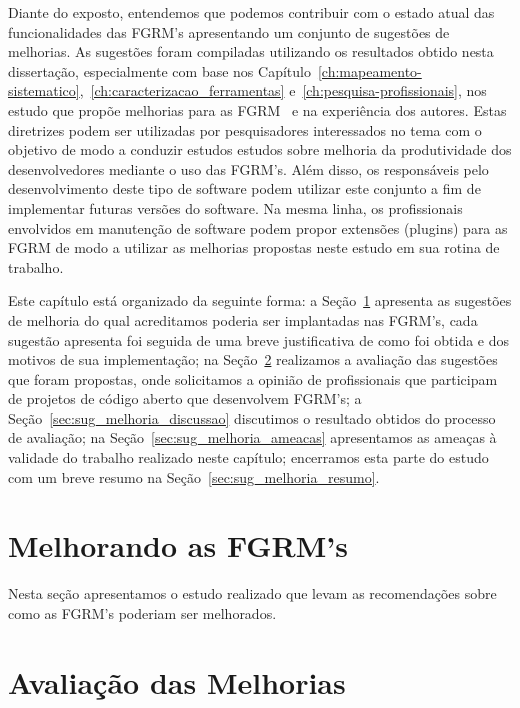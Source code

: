 Diante do exposto, entendemos que podemos contribuir com o estado atual das
funcionalidades das FGRM's apresentando um conjunto de sugestões de melhorias.
As sugestões foram compiladas utilizando os resultados obtido nesta dissertação,
especialmente com base nos
Capítulo~\ref{ch:mapeamento-sistematico},~\ref{ch:caracterizacao_ferramentas}
e~\ref{ch:pesquisa-profissionais}, nos estudo que propõe melhorias para as
FGRM~\cite{zimmermann2009improving, bettenburg2008makes, singh2011bug} e na
experiência dos autores. Estas diretrizes podem ser utilizadas por pesquisadores
interessados no tema com o objetivo de modo a conduzir estudos estudos sobre
melhoria da produtividade dos desenvolvedores mediante o uso das FGRM's. Além
disso, os responsáveis pelo desenvolvimento deste tipo de software podem
utilizar este conjunto a fim de implementar futuras versões do software. Na
mesma linha, os profissionais envolvidos em manutenção de software podem propor
extensões (plugins) para as FGRM de modo a utilizar as melhorias propostas neste
estudo em sua rotina de trabalho.

Este capítulo está organizado da seguinte forma: a
Seção~\ref{sec:sug_melhoria_melhorando_as_ferraementas} apresenta as sugestões
de melhoria do qual acreditamos poderia ser implantadas nas FGRM's, cada
sugestão apresenta foi seguida de uma breve justificativa de como foi obtida e
dos motivos de sua implementação; na
Seção~\ref{sec:sug_melhoria_avaliacao_das_melhorias} realizamos a avaliação das
sugestões que foram propostas, onde solicitamos a opinião de profissionais que
participam de projetos de código aberto que desenvolvem FGRM's; a
Seção~\ref{sec:sug_melhoria_discussao} discutimos o resultado obtidos do
processo de avaliação; na Seção~\ref{sec:sug_melhoria_ameacas} apresentamos as
ameaças à validade do trabalho realizado neste capítulo; encerramos esta parte
do estudo com um breve resumo na Seção~\ref{sec:sug_melhoria_resumo}.

\section{Melhorando as FGRM's}
\label{sec:sug_melhoria_melhorando_as_ferraementas}

Nesta seção apresentamos o estudo realizado que levam as recomendações sobre
como as FGRM's poderiam ser melhorados.

\section{Avaliação das Melhorias}
\label{sec:sug_melhoria_avaliacao_das_melhorias}

